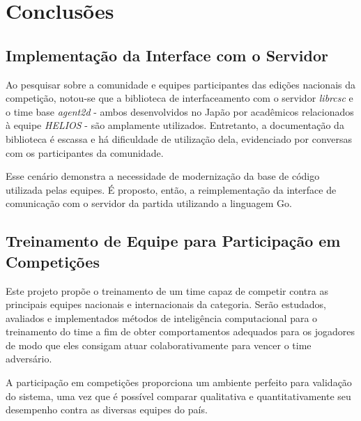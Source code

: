 
\chapter{Conclusões}
\label{chap:Conclusoes}

\section{Implementação da Interface com o Servidor}
\par Ao pesquisar sobre a comunidade e equipes participantes das edições nacionais da competição, notou-se que a biblioteca de interfaceamento com o servidor \textit{librcsc} e o time base \textit{agent2d} - ambos desenvolvidos no Japão por acadêmicos relacionados à equipe \textit{HELIOS} - são amplamente utilizados. Entretanto, a documentação da biblioteca é escassa e há dificuldade de utilização dela, evidenciado por conversas com os participantes da comunidade.

\par Esse cenário demonstra a necessidade de modernização da base de código utilizada pelas equipes.
É proposto, então, a reimplementação da interface de comunicação com o servidor da partida utilizando a linguagem Go.

\section{Treinamento de Equipe para Participação em Competições}
\par Este projeto propõe o treinamento de um time capaz de competir contra as principais equipes nacionais e internacionais da categoria.
Serão estudados, avaliados e implementados métodos de inteligência computacional para o treinamento do time a fim de obter comportamentos adequados para os jogadores de modo que eles consigam atuar colaborativamente para vencer o time adversário.

A participação em competições proporciona um ambiente perfeito para validação do sistema, uma vez que é possível comparar qualitativa e quantitativamente seu desempenho contra as diversas equipes do país.
